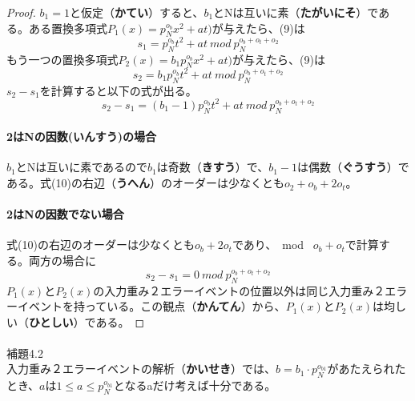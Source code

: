 \documentclass[24 pts]{article}
\begin{document}
\begin{proof}
$b_1=1$と仮定（\textbf{かてい}）すると、$b_1$とNは互いに素（\textbf{たがいにそ}）である。ある置換多項式$P_1(x)=p_N^{o_b} x^2+at) $が与えたら、(9)は$$s_1=p_N^{o_b}t^2 + at \ mod \ p_N^{o_b+o_t+o_2}$$
もう一つの置換多項式$P_2(x)=b_1p_N^{o_b} x^2+at)$が与えたら、(9)は
$$s_2=b_1p_N^{o_b}t^2 + at\ mod \ p_N^{o_b+o_t+o_2}$$
$s_2-s_1$を計算すると以下の式が出る。
\begin{equation}\tag{10}
s_2-s_1=(b_1-1)p_N^{o_b}t^2 + at \ mod \ p_N^{o_b+o_t+o_2}
\end{equation}

\paragraph{2はNの因数(\textbf{いんすう})の場合}$b_1$とNは互いに素であるので$b_1$は奇数（\textbf{きすう}）で、$b_1-1$は偶数（\textbf{ぐうすう}）である。式(10)の右辺（\textbf{うへん}）のオーダーは少なくとも$o_2+o_b+2o_t$。
\paragraph{2はNの因数でない場合}式(10)の右辺のオーダーは少なくとも$o_b+2o_t$であり、\ mod \ $o_b+o_t$で計算する。両方の場合に
$$s_2-s_1=0 \ mod \ p_N^{o_b+o_t+o_2}$$
$P_1(x)$と$P_2(x)$の入力重み２エラーイベントの位置以外は同じ入力重み２エラーイベントを持っている。この観点（\textbf{かんてん}）から、$P_1(x)$と$P_2(x)$は均しい（\textbf{ひとしい}）である。
\end{proof}
\paragraph{}
補題4.2\\
入力重み２エラーイベントの解析（\textbf{かいせき}）では、$b= b_1 \cdot p_N^{o_{b1}}$があたえられたとき、$a$は$1\leq a \leq p_N^{o_{b1}}$となるaだけ考えば十分である。
\end{document}
